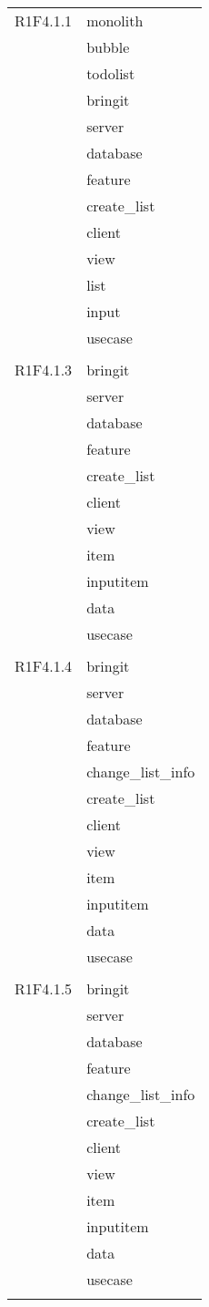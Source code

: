 \begin{center}
\begin{longtable}{|p{7cm}|p{7cm}|}
		R1F4.1.1 & monolith \\ & bubble \\ & todolist \\ & bringit \\ & server \\ & database \\ & feature \\ & create\_list \\ & client \\ & view \\ & list \\ & input \\ & usecase \\ & \\ \hline
		R1F4.1.3 & bringit \\ & server \\ & database \\ & feature \\ & create\_list \\ & client \\ & view \\ & item \\ & inputitem \\ & data \\ & usecase \\ & \\ \hline
		R1F4.1.4 & bringit \\ & server \\ & database \\ & feature \\ & change\_list\_info \\ & create\_list \\ & client \\ & view \\ & item \\ & inputitem \\ & data \\ & usecase \\ & \\ \hline
		R1F4.1.5 & bringit \\ & server \\ & database \\ & feature \\ & change\_list\_info \\ & create\_list \\ & client \\ & view \\ & item \\ & inputitem \\ & data \\ & usecase \\ & \\ \hline

\end{longtable}
\end{center}

